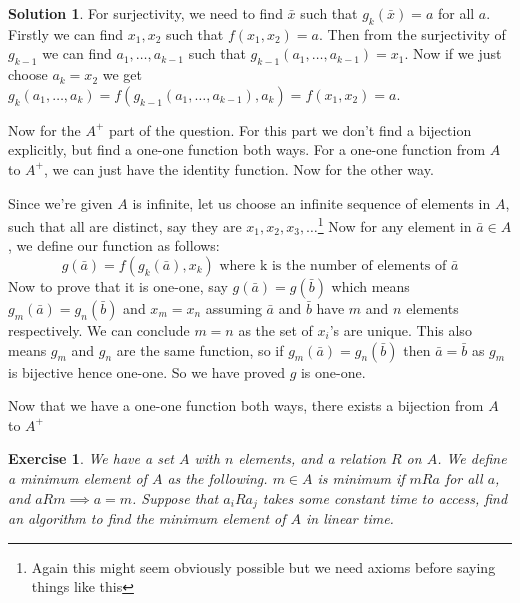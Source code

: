 \documentclass[a4paper,10pt]{article}
\newtheorem{exercise}{Exercise}[section]
\theoremstyle{definition} %
\newtheorem*{solution}{Solution}
\begin{document}
\begin{solution}
        For surjectivity, we need to find $\bar{x}$ such that $g_k(\bar{x}) = a$ for all $a$. Firstly we can find $x_1, x_2$ such that $f(x_1, x_2) = a$.
        Then from the surjectivity of $g_{k-1}$ we can find $a_1, \dots, a_{k-1}$ such that $g_{k-1}(a_1, \dots, a_{k-1}) = x_1$.
        Now if we just choose $a_k = x_2$ we get $g_k(a_1, \dots, a_k) = f(g_{k-1}(a_1, \dots, a_{k-1}), a_k) = f(x_1, x_2) = a$.
        
        Now for the $A^+$ part of the question. For this part we don't find a bijection explicitly, but find a one-one function both ways. For a one-one function
        from $A$ to $A^+$, we can just have the identity function. Now for the other way.

        Since we're given $A$ is infinite, let us choose an infinite sequence of elements in $A$,
        such that all are distinct, say they are $x_1, x_2, x_3, \dots$\footnote{Again this might seem obviously possible but we need axioms before saying things like this}
        Now for any element in $\bar{a} \in A$, we define our function as follows:
        \[ g(\bar{a}) = f(g_k(\bar{a}), x_k) \text{ where k is the number of elements of } \bar{a} \]
        Now to prove that it is one-one, say $g(\bar{a}) = g(\bar{b})$ which means $g_m(\bar{a}) = g_n(\bar{b})$ 
        and $x_m = x_n$ assuming $\bar{a}$ and $\bar{b}$ have $m$ and $n$ elements respectively. We can conclude $m = n$
        as the set of $x_i$'s are unique. This also means $g_m$ and $g_n$ are the same function, so if $g_m(\bar{a}) = g_n(\bar{b})$
        then $\bar{a} = \bar{b}$ as $g_m$ is bijective hence one-one. So we have proved $g$ is one-one.

        Now that we have a one-one function both ways, there exists a bijection from $A$ to $A^+$

    \end{solution}

    \begin{exercise}
        We have a set $A$ with $n$ elements, and a relation $R$ on $A$. We define a \emph{minimum} element 
        of $A$ as the following. $m \in A$ is minimum if $mRa$ for all $a$, and $aRm \implies a = m$. Suppose that
        $a_iRa_j$ takes some constant time to access, find an algorithm to find the minimum element of $A$ in linear time.
    \end{exercise}
\end{document}

